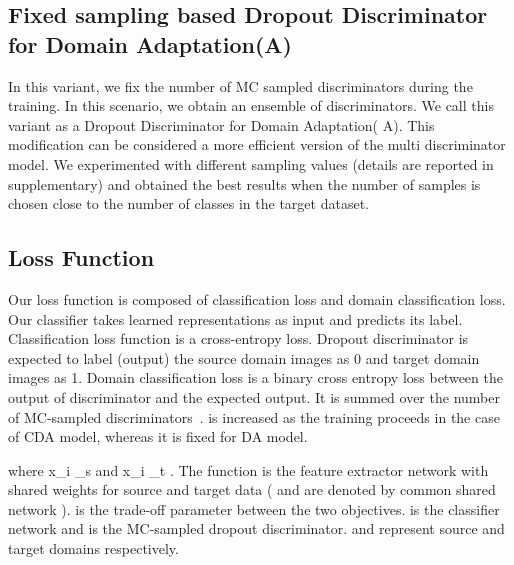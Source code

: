 \documentclass{bmvc2k}
\begin{document}
\subsection{Fixed sampling based Dropout Discriminator for Domain Adaptation(A)}
In this variant, we fix the number of MC sampled discriminators during the training. In this scenario, we obtain an ensemble of discriminators. We call this variant as a Dropout Discriminator for Domain Adaptation( A). This modification can be considered a more efficient version of the multi discriminator model. We experimented with different sampling values (details are reported in supplementary) and obtained the best results when the number of samples is chosen close to the number of classes in the target dataset. 










 


\subsection{Loss Function}
Our loss function is composed of classification loss and domain classification loss. Our classifier takes learned representations as input and predicts its label.  Classification loss function  is a cross-entropy loss. Dropout discriminator is expected to label (output) the source domain images as 0 and target domain images as 1. Domain classification loss  is a binary cross entropy loss between the output of discriminator and the expected output. It is summed over the number of MC-sampled discriminators~.   is increased as the training proceeds in the case of CDA model, whereas it is fixed for DA model. 
 






where  x_i \in {}_s  and  x_i \in {}_t  . The function  is the feature extractor network with shared weights for source and target data ( and  are denoted by common shared network ).  is the trade-off parameter between the two objectives.  is the classifier network and  is the  MC-sampled dropout discriminator.  and  represent source and target domains respectively.
\end{document}
